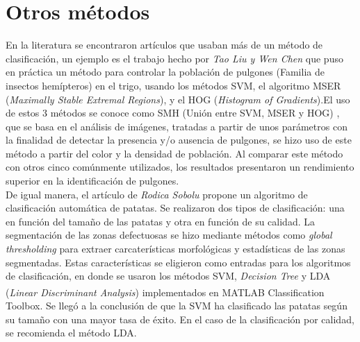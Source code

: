 \section{Otros métodos}
	En la literatura se encontraron artículos que usaban más de un método de clasificación, un ejemplo es el trabajo hecho por \textit{Tao Liu y Wen Chen} \cite{LIU201682} que puso en práctica un método para controlar la población de pulgones (Familia de insectos hemípteros) en el trigo, usando los métodos SVM, el algoritmo MSER (\textit{Maximally Stable Extremal Regions}), y el HOG (\textit{Histogram of Gradients}).El uso de estos 3 métodos se conoce como SMH (Unión entre SVM, MSER y HOG) , que se basa en el análisis de imágenes, tratadas a partir de unos parámetros con la finalidad de detectar la presencia y/o ausencia de pulgones, se hizo uso de este método a partir del color y la densidad de población. Al comparar este método con otros cinco comúnmente utilizados, los resultados presentaron un rendimiento superior en la identificación de pulgones. \\
	
	De igual manera, el artículo de \textit{Rodica Sobolu} \cite{sobolu2020automatic} propone un algoritmo de clasificación automática de patatas. Se realizaron dos tipos de clasificación: una en función del tamaño de las patatas y otra en función de su calidad. La segmentación de las zonas defectuosas se hizo mediante métodos como \textit{global thresholding} para extraer carcaterísticas morfológicas y estadísticas de las zonas segmentadas. Estas características se eligieron como entradas para los algoritmos de clasificación, en donde se usaron los métodos SVM, \textit{Decision  Tree} y LDA (\textit{Linear Discriminant Analysis}) implementados en MATLAB\textsuperscript{\textregistered} Classification Toolbox. Se llegó a la conclusión de que la SVM ha clasificado las patatas según su tamaño con una mayor tasa de éxito. En el caso de la clasificación por calidad, se recomienda el método LDA.\\
	
